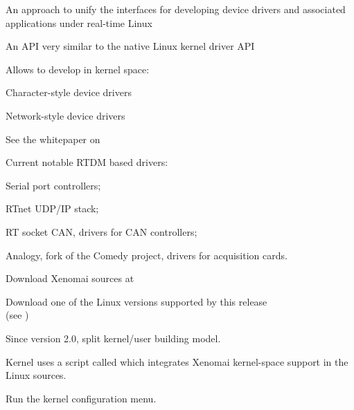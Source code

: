   \startitemize
  \item An approach to unify the interfaces for developing device
    drivers and associated applications under real-time Linux
    \startitemize
    \item An API very similar to the native Linux kernel driver API
    \stopitemize
  \item Allows to develop in kernel space:
    \startitemize
    \item Character-style device drivers
    \item Network-style device drivers
    \stopitemize
  \item See the whitepaper on\\
  \item Current notable RTDM based drivers:
    \startitemize
    \item Serial port controllers;
    \item RTnet UDP/IP stack;
    \item RT socket CAN, drivers for CAN controllers;
    \item Analogy, fork of the Comedy project, drivers for acquisition cards.
    \stopitemize
  \stopitemize


  \startitemize
  \item Download Xenomai sources at 
  \item Download one of the Linux versions supported by this release\\
    (see )
  \item Since version 2.0, split kernel/user building model.
  \item Kernel uses a script called 
    which integrates Xenomai kernel-space support in the Linux
    sources.
  \item Run the kernel configuration menu.
  \stopitemize


